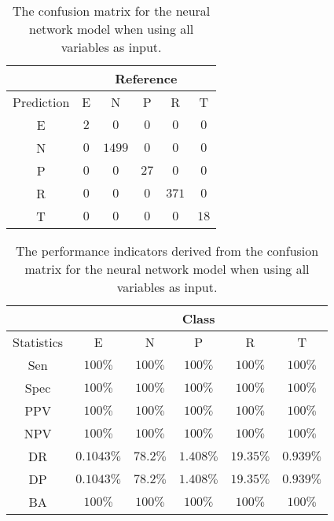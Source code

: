 \begin{table}[!ht]
	\centering
	\begin{tabular}{|c|c|c|c|c|c|}
		\hline
		 & \multicolumn{5}{|c|}{Reference} \\ \hline
		 Prediction & E & N & P & R & T \\ \hline
		 E & $2$ & $0$ & $0$ & $0$ & $0$ \\ \hline
		 N & $0$ & $1499$ & $0$ & $0$ & $0$ \\ \hline
		 P & $0$ & $0$ & $27$ & $0$ & $0$ \\ \hline
		 R & $0$ & $0$ & $0$ & $371$ & $0$ \\ \hline
		 T & $0$ & $0$ & $0$ & $0$ & $18$ \\ \hline
	\end{tabular}
	\caption{The confusion matrix for the neural network model when using all variables as input.}
	\label{tab:cm:all:nnet}
\end{table}

\begin{table}[!ht]
	\centering
	\begin{tabular}{|c|c|c|c|c|c|}
		\hline
		 & \multicolumn{5}{c|}{Class} \\ \hline
		Statistics & E & N & P & R & T \\ \hline
		Sen & $100\%$ & $100\%$ & $100\%$ & $100\%$ & $100\%$ \\ \hline
		Spec & $100\%$ & $100\%$ & $100\%$ & $100\%$ & $100\%$ \\ \hline
		PPV & $100\%$ & $100\%$ & $100\%$ & $100\%$ & $100\%$ \\ \hline
		NPV & $100\%$ & $100\%$ & $100\%$ & $100\%$ & $100\%$ \\ \hline
		DR & $0.1043\%$ & $78.2\%$ & $1.408\%$ & $19.35\%$ & $0.939\%$ \\ \hline
		DP & $0.1043\%$ & $78.2\%$ & $1.408\%$ & $19.35\%$ & $0.939\%$ \\ \hline
		BA & $100\%$ & $100\%$ & $100\%$ & $100\%$ & $100\%$ \\ \hline
	\end{tabular}
	\caption{The performance indicators derived from the confusion matrix for the neural network model when using all variables as input.}
	\label{tab:cs:reverse:all:nnet}
\end{table}

